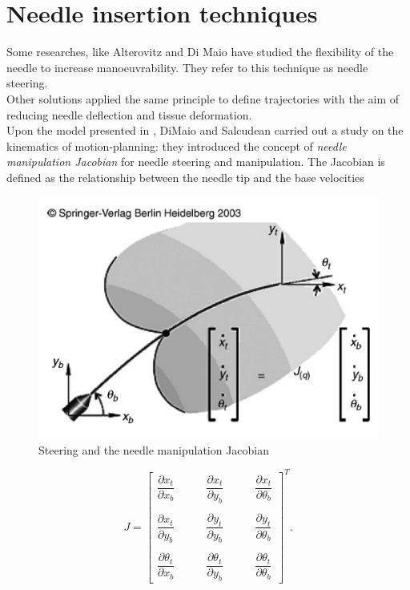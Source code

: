 \section{Needle insertion techniques}
Some researches, like Alterovitz \cite{Alterovitz2005} and Di Maio \cite{DiMaio2003Steering} have studied the flexibility of the needle to increase manoeuvrability. They refer to this technique as needle steering.\\
Other solutions applied the same principle to define trajectories with the aim of reducing needle deflection and tissue deformation.\\
Upon the model presented in \cite{DiMaio2003}, DiMaio and Salcudean carried out a study on the kinematics of motion-planning: they introduced the concept of \textit{needle manipulation Jacobian} for needle steering and manipulation.
The Jacobian  is defined as the relationship between the needle tip and the base velocities
\begin{figure}
	\centering
	\includegraphics[width=\textwidth/2]{images/needle_Jacobian.png}
	\caption[Needle manipulator Jacobian]{Steering and the needle manipulation Jacobian \cite{DiMaio2003}}
	\label{fig:needle_jacobian}
\end{figure}
\begin{equation}
	J = 
	\left[ 
	\begin{matrix}
		\dfrac{\partial x_{t}}{\partial x_{b}} \qquad & \dfrac{\partial x_{t}}{\partial y_{b}}  \qquad &\dfrac{\partial x_{t}}{\partial \theta_{b}} \\ \\
		\dfrac{\partial x_{t}}{\partial y_{b}}  \qquad& \dfrac{\partial y_{t}}{\partial y_{b}}  \qquad& \dfrac{\partial y_{t}}{\partial \theta_{b}} \\ \\
		\dfrac{\partial \theta_{t}}{\partial x_{b}}  \qquad& \dfrac{\partial \theta_{t}}{\partial y_{b}}  \qquad & \dfrac{\partial \theta_{t}}{\partial \theta_{b}}
	\end{matrix}
	\right]^{T}.
\end{equation}
